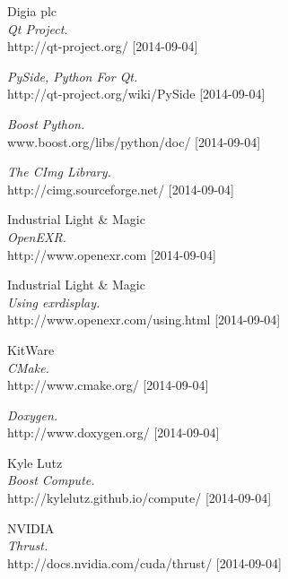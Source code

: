 \begin{thebibliography}{9}
  Digia plc \\
  \emph {Qt Project.} \\
  http://qt-project.org/ [2014-09-04]

  \emph {PySide, Python For Qt.} \\
  http://qt-project.org/wiki/PySide [2014-09-04]

  \emph {Boost Python.} \\
  www.boost.org/libs/python/doc/ [2014-09-04]

  \emph{The CImg Library.} \\
  http://cimg.sourceforge.net/ [2014-09-04]

  Industrial Light \& Magic \\
  \emph{OpenEXR.} \\
  http://www.openexr.com [2014-09-04]

  Industrial Light \& Magic \\
  \emph{Using exrdisplay.} \\
  http://www.openexr.com/using.html [2014-09-04]

  KitWare \\
  \emph{CMake.} \\
  http://www.cmake.org/ [2014-09-04]

  \emph{Doxygen.} \\
  http://www.doxygen.org/ [2014-09-04]

  Kyle Lutz \\
  \emph{Boost Compute.} \\
  http://kylelutz.github.io/compute/ [2014-09-04]

  NVIDIA \\
  \emph{Thrust.} \\
  http://docs.nvidia.com/cuda/thrust/ [2014-09-04]


\end{thebibliography}
